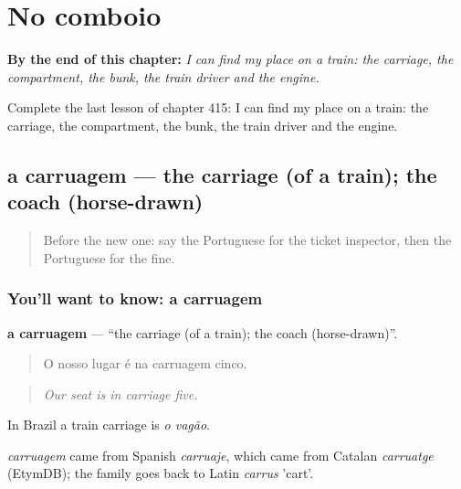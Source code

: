 
\chapter{No comboio}
\label{ch:pt-no-comboio}

\begin{chapteropening}
\textbf{By the end of this chapter:} \emph{I can find my place on a train: the carriage, the compartment, the bunk, the train driver and the engine.}

Complete the last lesson of chapter 415: I can find my place on a train: the carriage, the compartment, the bunk, the train driver and the engine.
\end{chapteropening}

\section[a carruagem]{a carruagem — the carriage (of a train); the coach (horse-drawn)}

\label{lesson:PT-C415-carruagem}



\begin{quote}
Before the new one: say the Portuguese for the ticket inspector, then the Portuguese for the fine.
\end{quote}

\subsection*{You'll want to know: a carruagem}
\textbf{a carruagem} — \textquotedblleft{}the carriage (of a train); the coach (horse-drawn)\textquotedblright{}.

\begin{quote}
O nosso lugar é na carruagem cinco.
\end{quote}

\begin{quote}
\emph{Our seat is in carriage five.}
\end{quote}

In Brazil a train carriage is \emph{o vagão}.

\begin{cousinweb}
\emph{carruagem} came from Spanish \emph{carruaje}, which came from Catalan \emph{carruatge} (EtymDB); the family goes back to Latin \emph{carrus} 'cart'.
\end{cousinweb}

